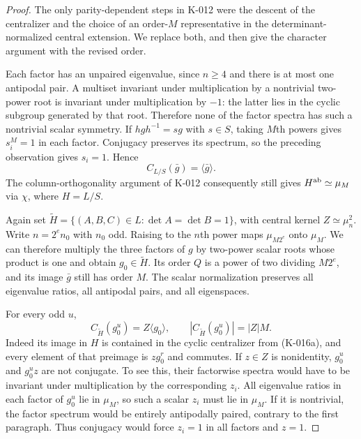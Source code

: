 \begin{proof}
The only parity-dependent steps in K-012 were the descent of the
centralizer and the choice of an order-$M$ representative in the
determinant-normalized central extension.  We replace both, and
then give the character argument with the revised order.

Each factor has an unpaired eigenvalue, since $n\ge4$ and there
is at most one antipodal pair.  A multiset invariant under
multiplication by a nontrivial two-power root is invariant under
multiplication by $-1$: the latter lies in the cyclic subgroup
generated by that root.  Therefore none of the factor spectra has
such a nontrivial scalar symmetry.  If $hgh^{-1}=sg$ with $s\in S$,
taking $M$th powers gives $s_i^M=1$ in each factor.  Conjugacy
preserves its spectrum, so the preceding observation gives
$s_i=1$.  Hence
\[
                 C_{L/S}(\bar g)=\langle\bar g\rangle.
                                                               \tag{K-016a}
\]
The column-orthogonality argument of K-012 consequently still gives
$H^{\rm ab}\simeq\mu_M$ via $\chi$, where $H=L/S$.

Again set
$\widetilde H=\{(A,B,C)\in L:\det A=\det B=1\}$,
with central kernel $Z\simeq\mu_n^2$.  Write $n=2^e n_0$ with
$n_0$ odd.  Raising to the $n$th power maps
$\mu_{M2^e}$ onto $\mu_M$.  We can therefore multiply the three
factors of $g$ by two-power scalar roots whose product is one and
obtain $g_0\in\widetilde H$.  Its order $Q$ is a power of two
dividing $M2^e$, and its image $\bar g$ still has order $M$.
The scalar normalization preserves all eigenvalue ratios, all
antipodal pairs, and all eigenspaces.

For every odd $u$,
\[
 C_{\widetilde H}(g_0^u)=Z\langle g_0\rangle,
               \qquad |C_{\widetilde H}(g_0^u)|=|Z|M.
                                                               \tag{K-016b}
\]
Indeed its image in $H$ is contained in the cyclic centralizer
from (K-016a), and every element of that preimage is $zg_0^r$ and
commutes.  If $z\in Z$ is nonidentity, $g_0^u$ and $g_0^uz$ are
not conjugate.  To see this, their factorwise spectra would have
to be invariant under multiplication by the corresponding $z_i$.
All eigenvalue ratios in each factor of $g_0^u$ lie in $\mu_M$,
so such a scalar $z_i$ must lie in $\mu_M$.  If it is nontrivial,
the factor spectrum would be entirely antipodally paired,
contrary to the first paragraph.  Thus conjugacy would force
$z_i=1$ in all factors and $z=1$.


\end{proof}
